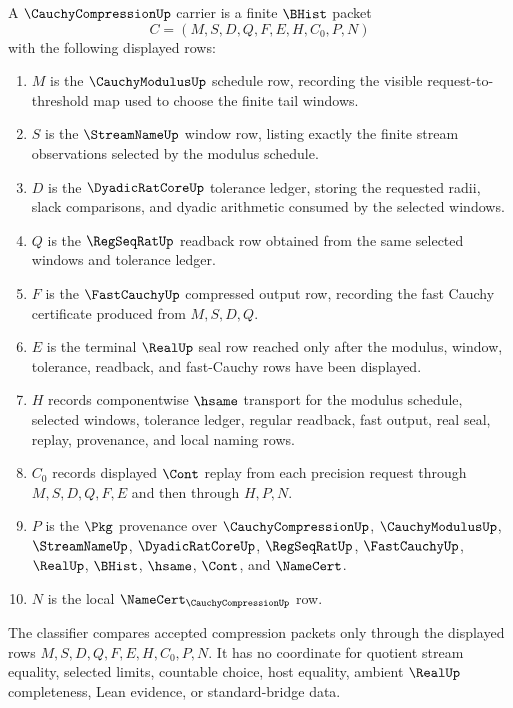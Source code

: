 \begin{definition}
\label{def:cauchy-compression-carrier}
A $\CauchyCompressionUp$ carrier is a finite $\BHist$ packet
$$
C=(M,S,D,Q,F,E,H,C_0,P,N)
$$
with the following displayed rows:
\begin{enumerate}
\item $M$ is the $\CauchyModulusUp$ schedule row, recording the visible request-to-threshold map used to choose the finite tail windows.
\item $S$ is the $\StreamNameUp$ window row, listing exactly the finite stream observations selected by the modulus schedule.
\item $D$ is the $\DyadicRatCoreUp$ tolerance ledger, storing the requested radii, slack comparisons, and dyadic arithmetic consumed by the selected windows.
\item $Q$ is the $\RegSeqRatUp$ readback row obtained from the same selected windows and tolerance ledger.
\item $F$ is the $\FastCauchyUp$ compressed output row, recording the fast Cauchy certificate produced from $M,S,D,Q$.
\item $E$ is the terminal $\RealUp$ seal row reached only after the modulus, window, tolerance, readback, and fast-Cauchy rows have been displayed.
\item $H$ records componentwise $\hsame$ transport for the modulus schedule, selected windows, tolerance ledger, regular readback, fast output, real seal, replay, provenance, and local naming rows.
\item $C_0$ records displayed $\Cont$ replay from each precision request through $M,S,D,Q,F,E$ and then through $H,P,N$.
\item $P$ is the $\Pkg$ provenance over $\CauchyCompressionUp$, $\CauchyModulusUp$, $\StreamNameUp$, $\DyadicRatCoreUp$, $\RegSeqRatUp$, $\FastCauchyUp$, $\RealUp$, $\BHist$, $\hsame$, $\Cont$, and $\NameCert$.
\item $N$ is the local $\NameCert_{\CauchyCompressionUp}$ row.
\end{enumerate}
The classifier compares accepted compression packets only through the displayed rows $M,S,D,Q,F,E,H,C_0,P,N$. It has no coordinate for quotient stream equality, selected limits, countable choice, host equality, ambient $\RealUp$ completeness, Lean evidence, or standard-bridge data.
\end{definition}

